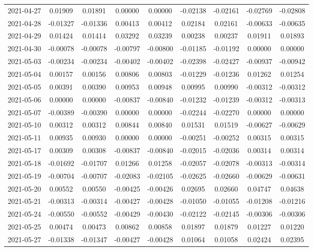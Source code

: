 {\begin{footnotesize}
\begin{longtable}{lcccccccc}
2021-04-27 & 0.01909 & 0.01891 & 0.00000 & 0.00000 & -0.02138 & -0.02161 & -0.02769 & -0.02808 \\
2021-04-28 & -0.01327 & -0.01336 & 0.00413 & 0.00412 & 0.02184 & 0.02161 & -0.00633 & -0.00635 \\
2021-04-29 & 0.01424 & 0.01414 & 0.03292 & 0.03239 & 0.00238 & 0.00237 & 0.01911 & 0.01893 \\
2021-04-30 & -0.00078 & -0.00078 & -0.00797 & -0.00800 & -0.01185 & -0.01192 & 0.00000 & 0.00000 \\
2021-05-03 & -0.00234 & -0.00234 & -0.00402 & -0.00402 & -0.02398 & -0.02427 & -0.00937 & -0.00942 \\
2021-05-04 & 0.00157 & 0.00156 & 0.00806 & 0.00803 & -0.01229 & -0.01236 & 0.01262 & 0.01254 \\
2021-05-05 & 0.00391 & 0.00390 & 0.00953 & 0.00948 & 0.00995 & 0.00990 & -0.00312 & -0.00312 \\
2021-05-06 & 0.00000 & 0.00000 & -0.00837 & -0.00840 & -0.01232 & -0.01239 & -0.00312 & -0.00313 \\
2021-05-07 & -0.00389 & -0.00390 & 0.00000 & 0.00000 & -0.02244 & -0.02270 & 0.00000 & 0.00000 \\
2021-05-10 & 0.00312 & 0.00312 & 0.00844 & 0.00840 & 0.01531 & 0.01519 & -0.00627 & -0.00629 \\
2021-05-11 & 0.00935 & 0.00930 & 0.00000 & 0.00000 & -0.00251 & -0.00252 & 0.00315 & 0.00315 \\
2021-05-17 & 0.00309 & 0.00308 & -0.00837 & -0.00840 & -0.02015 & -0.02036 & 0.00314 & 0.00314 \\
2021-05-18 & -0.01692 & -0.01707 & 0.01266 & 0.01258 & -0.02057 & -0.02078 & -0.00313 & -0.00314 \\
2021-05-19 & -0.00704 & -0.00707 & -0.02083 & -0.02105 & -0.02625 & -0.02660 & -0.00629 & -0.00631 \\
2021-05-20 & 0.00552 & 0.00550 & -0.00425 & -0.00426 & 0.02695 & 0.02660 & 0.04747 & 0.04638 \\
2021-05-21 & -0.00313 & -0.00314 & -0.00427 & -0.00428 & -0.01050 & -0.01055 & -0.01208 & -0.01216 \\
2021-05-24 & -0.00550 & -0.00552 & -0.00429 & -0.00430 & -0.02122 & -0.02145 & -0.00306 & -0.00306 \\
2021-05-25 & 0.00474 & 0.00473 & 0.00862 & 0.00858 & 0.01897 & 0.01879 & 0.01227 & 0.01220 \\
2021-05-27 & -0.01338 & -0.01347 & -0.00427 & -0.00428 & 0.01064 & 0.01058 & 0.02424 & 0.02395 \\

\end{longtable}
\end{footnotesize}}

